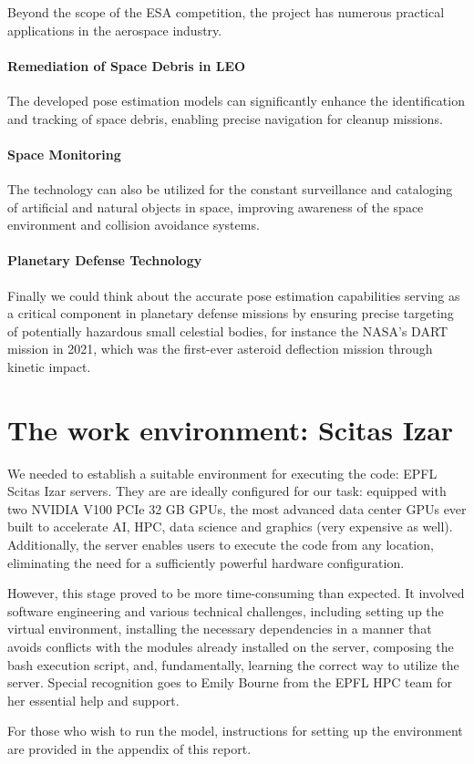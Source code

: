 Beyond the scope of the \ac{ESA} competition, the project has numerous practical applications in the aerospace industry.

\paragraph{Remediation of Space Debris in \ac{LEO}} The developed pose estimation models can significantly enhance the identification and tracking of space debris, enabling precise navigation for cleanup missions.

\paragraph{Space Monitoring} The technology can also be utilized for the constant surveillance and cataloging of artificial and natural objects in space, improving awareness of the space environment and collision avoidance systems.

\paragraph{Planetary Defense Technology} Finally we could think about the accurate pose estimation capabilities serving as a critical component in planetary defense missions by ensuring precise targeting of potentially hazardous small celestial bodies, for instance the NASA’s \ac{DART} mission in 2021, which was the first-ever asteroid deflection mission through kinetic impact.

\section{The work environment: Scitas Izar}

We needed to establish a suitable environment for executing the code: EPFL Scitas Izar servers. They are are ideally configured for our task: equipped with two NVIDIA V100 PCIe 32 GB GPUs, the most advanced data center GPUs ever built to accelerate \ac{AI}, \ac{HPC}, data science and graphics (very expensive as well). Additionally, the server enables users to execute the code from any location, eliminating the need for a sufficiently powerful hardware configuration.

However, this stage proved to be more time-consuming than expected. It involved software engineering and various technical challenges, including setting up the virtual environment, installing the necessary dependencies in a manner that avoids conflicts with the modules already installed on the server, composing the bash execution script, and, fundamentally, learning the correct way to utilize the server. Special recognition goes to Emily Bourne from the EPFL \ac{HPC} team for her essential help and support.

For those who wish to run the model, instructions for setting up the environment are provided in the appendix of this report.
